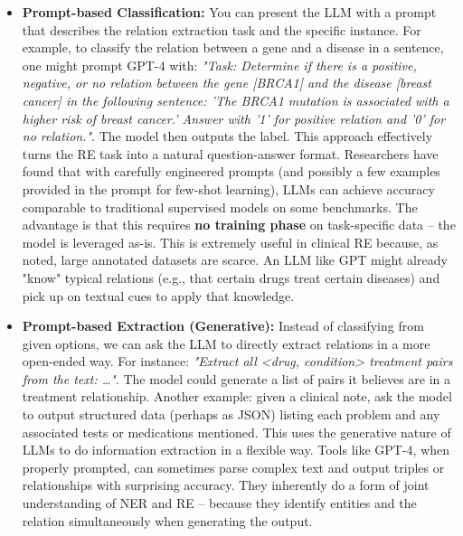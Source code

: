 \begin{itemize}
\item \textbf{Prompt-based Classification:} You can present the LLM with a prompt that describes the relation extraction task and the specific instance. For example, to classify the relation between a gene and a disease in a sentence, one might prompt GPT-4 with: \emph{"Task: Determine if there is a positive, negative, or no relation between the gene [BRCA1] and the disease [breast cancer] in the following sentence: 'The BRCA1 mutation is associated with a higher risk of breast cancer.' Answer with '1' for positive relation and '0' for no relation."}. The model then outputs the label. This approach effectively turns the RE task into a natural question-answer format. Researchers have found that with carefully engineered prompts (and possibly a few examples provided in the prompt for few-shot learning), LLMs can achieve accuracy comparable to traditional supervised models on some benchmarks. The advantage is that this requires \textbf{no training phase} on task-specific data – the model is leveraged as-is. This is extremely useful in clinical RE because, as noted, large annotated datasets are scarce. An LLM like GPT might already "know" typical relations (e.g., that certain drugs treat certain diseases) and pick up on textual cues to apply that knowledge.

\item \textbf{Prompt-based Extraction (Generative):} Instead of classifying from given options, we can ask the LLM to directly extract relations in a more open-ended way. For instance: \emph{"Extract all <drug, condition> treatment pairs from the text: …"}. The model could generate a list of pairs it believes are in a treatment relationship. Another example: given a clinical note, ask the model to output structured data (perhaps as JSON) listing each problem and any associated tests or medications mentioned. This uses the generative nature of LLMs to do information extraction in a flexible way. Tools like GPT-4, when properly prompted, can sometimes parse complex text and output triples or relationships with surprising accuracy. They inherently do a form of joint understanding of NER and RE – because they identify entities and the relation simultaneously when generating the output.
\end{itemize}

